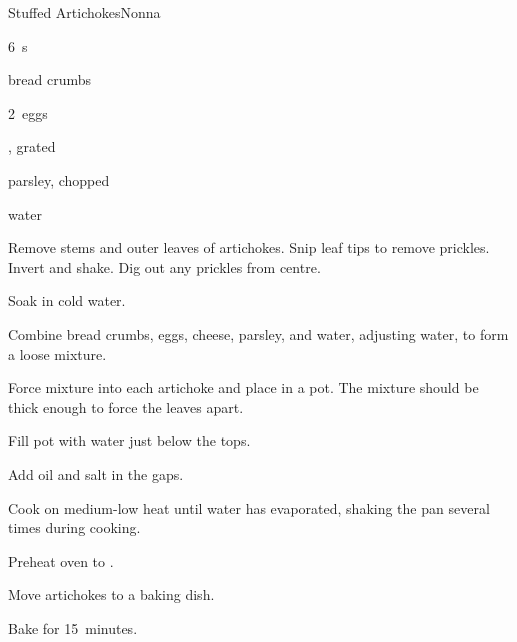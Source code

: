 \begin{recipe}{Stuffed Artichokes}{Nonna}{}

\begin{ingredients}
\item 6~s
\item {} bread crumbs
\item 2~eggs
\item {} , grated
\item {} parsley, chopped
\item {} water
\end{ingredients}

\begin{directions}
\item Remove stems and outer leaves of artichokes. Snip leaf tips to remove prickles. Invert and shake. Dig out any prickles from centre.
\item Soak in cold water.
\item Combine bread crumbs, eggs, cheese, parsley, and water, adjusting water, to form a loose mixture.
\item Force mixture into each artichoke and place in a pot. The mixture should be thick enough to force the leaves apart.
\item Fill pot with water just below the tops.
\item Add oil and salt in the gaps.
\item Cook on medium-low heat until water has evaporated, shaking the pan several times during cooking.
\item Preheat oven to .
\item Move artichokes to a baking dish.
\item Bake for 15~minutes.
\end{directions}

\end{recipe}
